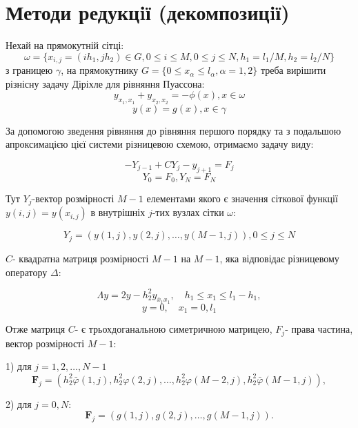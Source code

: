 \chapter{Методи редукцiї (декомпозицiї)}


Нехай на прямокутній сітці:
$$ \omega = \{ x_{i,j} = (ih_1, jh_2) \in G, 
0 \le i \le M, 0 \le j \le N, h_1 = l_1 / M, h_2 = l_2 / N \} $$
з границею $\gamma$, на прямокутнику $G = \{0 \le x_\alpha \le l_\alpha, \alpha = 1,2 \}$
треба вирішити різнісну задачу Діріхле для рівняння Пуассона: 
$$ y_{x_1, x_1} + y_{x_2, x_2} = -\phi(x), x\in \omega $$
$$ y(x) = g(x), x \in \gamma $$


За допомогою зведення рівняння до рівняння першого порядку та з подальшою апроксимацією 
цієї системи різницевою схемою, отримаємо задачу виду:

$$ -Y_{j-1} + C Y_j - y_{j+1} = F_j $$
$$ Y_0 = F_0, Y_N = F_N $$

Тут $Y_j$-вектор розмірності $M-1$ елементами якого є значення сіткової функції 
$y(i, j)= y(x_{i,j})$ в внутрішніх $j$-тих вузлах сітки $\omega$:

$$ Y_j = (y(1, j), y(2, j), \dots , y(M-1, j)), 0\le j \le N $$

$C$- квадратна матриця розмірності $M-1$ на $M-1$, 
яка відповідає різницевому оператору $\Delta$:

$$\Lambda y =2 y-h_2^2 y_{\bar{x}_1 x_1}, \quad h_1 \le x_1 \le l_1-h_1,$$ 
$$y =0, \quad x_1=0, l_1$$

Отже матриця $C$- є трьохдоганальною симетричною матрицею, 
$F_j$- права частина, вектор розмірності $M-1$: 



1) для $j = 1, 2, \dots, N-1$
$$\boldsymbol{F}_j=\left(h_2^2 \bar{\varphi}(1, j), h_2^2 \varphi(2, j), \ldots, h_2^2 \varphi(M-2, j), h_2^2 \bar{\varphi}(M-1, j)\right),$$


2) для $j = 0, N$:
$$\boldsymbol{F}_j=(g(1, j), g(2, j), \ldots, g(M-1, j)).$$
